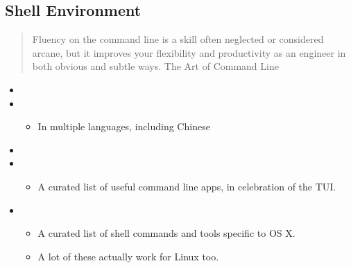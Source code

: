 \documentclass[letterpaper,10pt,english]{sphinxmanual}
\begin{document}
\subsection{Shell Environment}
\label{\detokenize{resource/research/computer_basics:shell-environment}}\begin{quote}

Fluency on the command line is a skill often neglected or considered
arcane, but it improves your flexibility and productivity as an
engineer in both obvious and subtle ways. \textendash{} The Art of Command Line
\end{quote}
\begin{itemize}
\item {} 

\item {} 
\begin{itemize}
\item {} 
In multiple languages, including Chinese

\end{itemize}

\item {} 

\item {} 
\begin{itemize}
\item {} 
A curated list of useful command line apps, in celebration of the
TUI.

\end{itemize}

\item {} 
\begin{itemize}
\item {} 
A curated list of shell commands and tools specific to OS X.

\item {} 
A lot of these actually work for Linux too.

\end{itemize}

\end{itemize}
\end{document}

